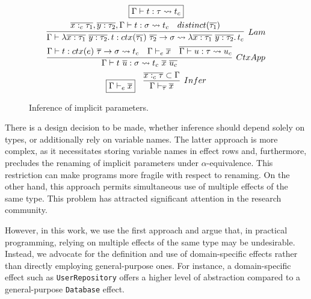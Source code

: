 \documentclass[acmsmall,review,screen]{acmart}
\newcommand{\mathframebox}[1]{\framebox{$\displaystyle #1$}}
\newcommand{\ap}{~}
\newcommand{\ctx}[1]{ctx(#1)~}
\newcommand{\step}{\rightsquigarrow}
\begin{document}
\begin{figure}
    \begin{gather*}
        \mathframebox{\Gamma\vdash t : \tau \step t_{c}} \\
        \infer[Lam]{
            \Gamma\vdash \lambda \overline{x : \tau_1} ~ \overline{y : \tau_2} \ldotp t : ctx(\overline{\tau_1}) ~ \overline{\tau_2} \to \sigma \step \lambda \overline{x : \tau_1} ~ \overline{y : \tau_2} \ldotp t_c
        }{
            \overline{x :_c \tau_1}, \overline{y : \tau_2}, \Gamma\vdash t : \sigma \step t_c &
            distinct(\overline{\tau_1})
        } \\
        \infer[CtxApp]{
            \Gamma\vdash t\ap\overline{u} : \sigma \step t_{c} \ap \overline{x}\ap\overline{u_{c}}
        }{
            \Gamma\vdash t : \ctx{e} \overline{\tau} \to \sigma \step t_{c} &
            \Gamma\vdash_e\overline{x} &
            \overline{\Gamma\vdash u : \tau \step u_{c}}
        } \\
        \begin{array}{cc}
            \mathframebox{\Gamma\vdash_e \overline{x}} &
            \infer[Infer]{
                \Gamma\vdash_{\overline{\tau}} \overline{x}
            }{
                \overline{x :_c \tau}\subset \Gamma
            }
        \end{array}
    \end{gather*}
    \caption{Inference of implicit parameters.}
    \label{fig:core-im-core-implicit-inference}
\end{figure}

There is a design decision to be made, whether inference should depend solely on types, or additionally rely on variable names.
The latter approach is more complex, as it necessitates storing variable names in effect rows and, furthermore, precludes the renaming of implicit parameters under $\alpha$-equivalence.
This restriction can make programs more fragile with respect to renaming.
On the other hand, this approach permits simultaneous use of multiple effects of the same type.
This problem has attracted significant attention in the research community. %

However, in this work, we use the first approach and argue that, in practical programming, relying on multiple effects of the same type may be undesirable.
Instead, we advocate for the definition and use of domain-specific effects rather than directly employing general-purpose ones.
For instance, a domain-specific effect such as \texttt{UserRepository} offers a higher level of abstraction compared to a general-purpose \texttt{Database} effect.
\end{document}

